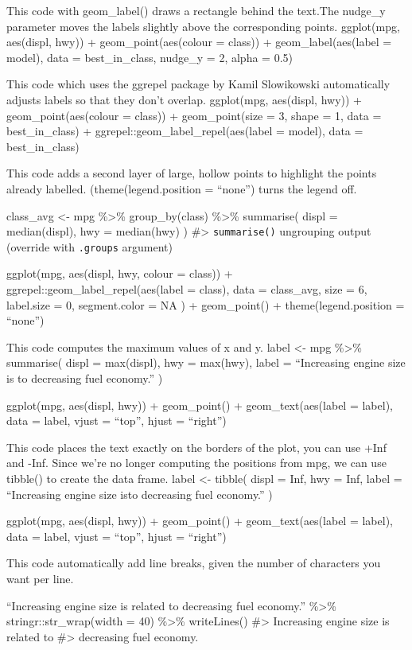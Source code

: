 \documentclass[
]{article}
\begin{document}
This code with geom\_label() draws a rectangle behind the text.The
nudge\_y parameter moves the labels slightly above the corresponding
points. ggplot(mpg, aes(displ, hwy)) + geom\_point(aes(colour = class))
+ geom\_label(aes(label = model), data = best\_in\_class, nudge\_y = 2,
alpha = 0.5)

This code which uses the ggrepel package by Kamil Slowikowski
automatically adjusts labels so that they don't overlap. ggplot(mpg,
aes(displ, hwy)) + geom\_point(aes(colour = class)) + geom\_point(size =
3, shape = 1, data = best\_in\_class) +
ggrepel::geom\_label\_repel(aes(label = model), data = best\_in\_class)

This code adds a second layer of large, hollow points to highlight the
points already labelled. (theme(legend.position = ``none'') turns the
legend off.

class\_avg \textless- mpg \%\textgreater\% group\_by(class)
\%\textgreater\% summarise( displ = median(displ), hwy = median(hwy) )
\#\textgreater{} \texttt{summarise()} ungrouping output (override with
\texttt{.groups} argument)

ggplot(mpg, aes(displ, hwy, colour = class)) +
ggrepel::geom\_label\_repel(aes(label = class), data = class\_avg, size
= 6, label.size = 0, segment.color = NA ) + geom\_point() +
theme(legend.position = ``none'')

This code computes the maximum values of x and y. label \textless- mpg
\%\textgreater\% summarise( displ = max(displ), hwy = max(hwy), label =
``Increasing engine size is \nrelated to decreasing fuel economy.'' )

ggplot(mpg, aes(displ, hwy)) + geom\_point() + geom\_text(aes(label =
label), data = label, vjust = ``top'', hjust = ``right'')

This code places the text exactly on the borders of the plot, you can
use +Inf and -Inf. Since we're no longer computing the positions from
mpg, we can use tibble() to create the data frame. label \textless-
tibble( displ = Inf, hwy = Inf, label = ``Increasing engine size
is\nrelated to decreasing fuel economy.'' )

ggplot(mpg, aes(displ, hwy)) + geom\_point() + geom\_text(aes(label =
label), data = label, vjust = ``top'', hjust = ``right'')

This code automatically add line breaks, given the number of characters
you want per line.

``Increasing engine size is related to decreasing fuel economy.''
\%\textgreater\% stringr::str\_wrap(width = 40) \%\textgreater\%
writeLines() \#\textgreater{} Increasing engine size is related to
\#\textgreater{} decreasing fuel economy.
\end{document}
